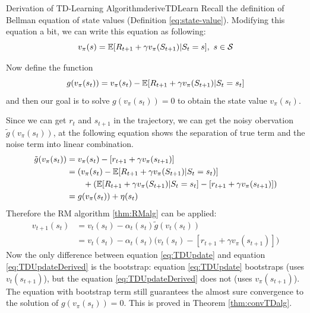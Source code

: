     \begin{rem}{Derivation of TD-Learning Algorithm}{deriveTDLearn}
        Recall the definition of Bellman equation of state values (Definition \ref{eq:state-value}).
        Modifying this equation a bit, we can write this equation as following:
        \begin{equation}
            v_\pi(s) = \mathbb{E}[R_{t+1} + \gamma v_\pi(S_{t+1})|S_t=s],\ s \in \mathcal{S}
        \end{equation}

        Now define the function
        \begin{equation}
            g(v_\pi(s_t)) = v_\pi(s_t) - \mathbb{E}[R_{t+1} + \gamma v_\pi(S_{t+1})|S_t=s_t]
        \end{equation}
        and then our goal is to solve $g(v_\pi(s_t))=0$ to obtain the state value $v_\pi(s_t)$.

        Since we can get $r_t$ and $s_{t+1}$ in the trajectory, we can get the noisy obervation $\tilde{g}(v_\pi(s_t))$, at the
        following equation shows the separation of true term and the noise term into linear combination.
        \begin{align}
            \tilde{g}(v_\pi(s_t)) &= v_\pi(s_t) - [r_{t+1} + \gamma v_\pi(s_{t+1})] \\
                                  &= (v_\pi(s_t) - \mathbb{E}[R_{t+1} + \gamma v_\pi(S_{t+1})|S_t=s_t)] \\
                                  &\qquad + (\mathbb{E}[R_{t+1} + \gamma v_\pi(S_{t+1})|S_t=s_t] - [r_{t+1} + \gamma v_\pi(s_{t+1})]) \\
                                  &= g(v_\pi(s_t)) + \eta(s_t)
        \end{align}
        Therefore the RM algorithm \ref{thm:RMalg} can be applied:
        \begin{align}
            v_{t+1}(s_t) &= v_t(s_t) - \alpha_t(s_t)\tilde{g}(v_t(s_t)) \\
                         &= v_t(s_t) - \alpha_t(s_t)\Big( v_t(s_t) - [r_{t+1} + \gamma v_\pi(s_{t+1})] \Big) \label{eq:TDUpdateDerived}
        \end{align}
        Now the only difference between equation \ref{eq:TDUpdate} and equation \ref{eq:TDUpdateDerived} is the bootstrap:
        equation \ref{eq:TDUpdate} bootstraps (uses $v_t(s_{t+1})$), but the equation \ref{eq:TDUpdateDerived} does not (uses $v_\pi(s_{t+1})$).
        The equation with bootstrap term still guarantees the almost sure convergence to the solution of $g(v_\pi(s_t))=0$. This is proved in Theorem \ref{thm:convTDalg}.
    \end{rem}

